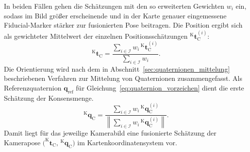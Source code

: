 In beiden Fällen gehen die Schätzungen mit den so erweiterten Gewichten $w_i$ ein, sodass im Bild größer erscheinende und in der Karte genauer eingemessene Fiducial-Marker stärker zur fusionierten Pose beitragen.
Die Position ergibt sich als gewichteter Mittelwert der einzelnen Positionsschätzungen $^{\mathrm{K}}\mathbf{t}_{\mathrm{C}}^{(i)}$:
\begin{equation}
^{\mathrm{K}}\mathbf{t}_{\mathrm{C}} = \frac{\displaystyle\sum_{i \in \mathcal{I}} w_i \, {^{\mathrm{K}}\mathbf{t}_{\mathrm{C}}^{(i)}}}{\displaystyle\sum_{i \in \mathcal{I}} w_i}.
\label{eq:pos_fusion_t}
\end{equation}
Die Orientierung wird nach dem in Abschnitt~\ref{sec:quaternionen_mittelung} beschriebenen Verfahren zur Mittelung von Quaternionen zusammengefasst.
Als Referenzquaternion $\mathbf{q}_{\mathrm{ref}}$ für Gleichung~\ref{eq:quaternion_vorzeichen} dient die erste Schätzung der Konsensmenge.
\begin{equation}
^{\mathrm{K}}\mathbf{q}_{\mathrm{C}} = \frac{\displaystyle\sum_{i \in \mathcal{I}} w_i \, {^{\mathrm{K}}\mathbf{q}_{\mathrm{C}}^{(i)}}}{\left\lVert \displaystyle\sum_{i \in \mathcal{I}} w_i \, {^{\mathrm{K}}\mathbf{q}_{\mathrm{C}}^{(i)}} \right\rVert}.
\label{eq:pos_fusion_q}
\end{equation}
Damit liegt für das jeweilige Kamerabild eine fusionierte Schätzung der
Kamerapose $\bigl(^{\mathrm{K}}\mathbf{t}_{\mathrm{C}},\,{^{\mathrm{K}}\mathbf{q}_{\mathrm{C}}}\bigr)$ im Kartenkoordinatensystem vor.




